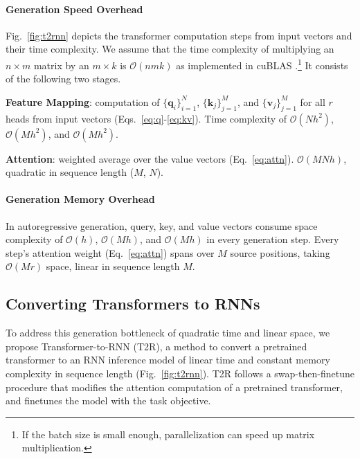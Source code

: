 \documentclass[11pt]{article}
\def\vk{{\mathbf{k}}}
\def\vq{{\mathbf{q}}}
\def\vv{{\mathbf{v}}}
\def\gO{{\mathcal{O}}}
\newcommand{\TRNN}{T2R\xspace}
\begin{document}
\paragraph{Generation Speed Overhead}
Fig.\ \ref{fig:t2rnn} depicts the transformer computation steps from input vectors and their time complexity.
We assume that the time complexity of multiplying an $n \times m$ matrix by an $m \times k$ is $\gO(nmk)$ as implemented in cuBLAS \cite{cublas}.\footnote{If the batch size is small enough, parallelization can speed up matrix multiplication.}
It consists of the following two stages.
\begin{compactitem}
\item \textbf{Feature Mapping}: computation of $\{\vq_i\}_{i=1}^N$,  $\{\vk_j\}_{j=1}^M$, and $\{\vv_j\}_{j=1}^M$ for all $r$ heads from input vectors (Eqs.\ \ref{eq:q}-\ref{eq:kv}).
Time complexity of $\gO(Nh^2)$, $\gO(Mh^2)$, and $\gO(Mh^2)$.
\item \textbf{Attention}: weighted average over the value vectors (Eq.\ \ref{eq:attn}). $\gO(MNh)$, quadratic in sequence length ($M$, $N$).
\end{compactitem}
\paragraph{Generation Memory Overhead}
In autoregressive generation, 
query, key, and value vectors consume space complexity of $\gO(h)$, $\gO(Mh)$, and $\gO(Mh)$ in every generation step.
Every step's attention weight (Eq.~\ref{eq:attn}) spans over $M$ source positions, taking $\gO(Mr)$ space, linear in sequence length $M$.



\subsection{Converting Transformers to RNNs}
\label{sec:convert}
To address this generation bottleneck of quadratic time and linear space, we propose Transformer-to-RNN (\TRNN), a method to convert a pretrained transformer to an RNN inference model of linear time and constant memory complexity in sequence length (Fig.\ \ref{fig:t2rnn}).
\TRNN follows a swap-then-finetune procedure that modifies the attention computation of a pretrained transformer, and finetunes the model with the task objective.
\end{document}
